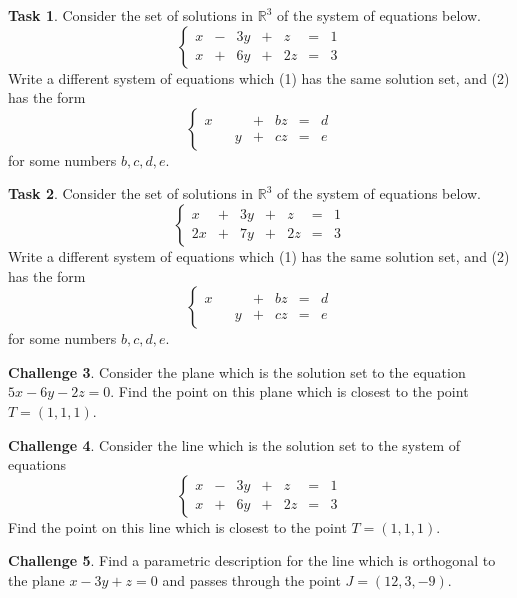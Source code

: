 \documentclass{tufte-book}
\theoremstyle{definition}
\newtheorem{task}{Task}
\newtheorem{challenge}[task]{Challenge}
\begin{document}
\begin{task}
Consider the set of solutions in $\mathbb{R}^3$ of the system of equations below. 
\[
\left\{\begin{array}{rrrrrrr}
x & - & 3y & + & z & = & 1 \\
x & + & 6y & + & 2z & = & 3
\end{array}\right.
\]
Write a different system of equations which (1) has the same solution set, and (2) has the form
\[
\left\{\begin{array}{rrrrrrr}
x &  &  & + & bz & = & d \\
 &  & y & + & cz & = & e
\end{array}\right.
\]
for some numbers $b,c,d,e$.
\end{task}

\begin{task}
Consider the set of solutions in $\mathbb{R}^3$ of the system of equations below. 
\[
\left\{\begin{array}{rrrrrrr}
x & + & 3y & + & z & = & 1 \\
2x & + & 7y & + & 2z & = & 3
\end{array}\right.
\]
Write a different system of equations which (1) has the same solution set, and (2) has the form
\[
\left\{\begin{array}{rrrrrrr}
x &  &  & + & bz & = & d \\
 &  & y & + & cz & = & e
\end{array}\right.
\]
for some numbers $b,c,d,e$.
\end{task}

\begin{challenge}
Consider the plane which is the solution set to the equation $5x-6y-2z=0$. Find the point on this plane which is closest to the point $T = (1,1,1)$.
\end{challenge}

\begin{challenge}
Consider the line which is the solution set to the system of equations
\[
\left\{\begin{array}{rrrrrrr}
x & - & 3y & + & z & = & 1 \\
x & + & 6y & + & 2z & = & 3
\end{array}\right.
\]
Find the point on this line which is closest to the point $T = (1,1,1)$.
\end{challenge}

\begin{challenge}
Find a parametric description for the line which is orthogonal to the plane $x-3y+z=0$ and passes through the point $J = (12,3,-9)$.
\end{challenge}
\end{document}

